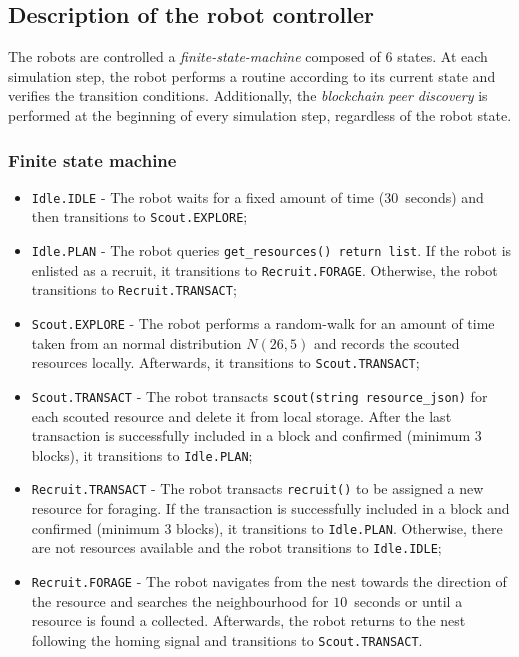 \documentclass[runningheads]{llncs}
\begin{document}
\subsection{Description of the robot controller}
The robots are controlled a \emph{finite-state-machine} composed of 6 states. At each simulation step, the robot performs a routine according to its current state and verifies the transition conditions. Additionally, the \emph{blockchain peer discovery } is performed at the beginning of every simulation step, regardless of the robot state.

\subsubsection{Finite state machine}
\label{sec:finite-state-machine}
\begin{itemize}
\item \texttt{Idle.IDLE} - The robot waits for a fixed amount of time ($30$~seconds) and then transitions to \texttt{Scout.EXPLORE};
\item \texttt{Idle.PLAN} - The robot queries \texttt{get\_resources() return list}. If the robot is enlisted as a recruit, it transitions to \texttt{Recruit.FORAGE}. Otherwise, the robot transitions to \texttt{Recruit.TRANSACT};
\item \texttt{Scout.EXPLORE} - The robot performs a random-walk for an amount of time taken from an normal distribution $N(26,5)$ and records the scouted resources locally. Afterwards, it transitions to \texttt{Scout.TRANSACT};
\item \texttt{Scout.TRANSACT} - The robot transacts \texttt{scout(string resource\_json)} for each scouted resource and delete it from local storage. After the last transaction is successfully included in a block and confirmed (minimum 3 blocks), it transitions to \texttt{Idle.PLAN};
\item \texttt{Recruit.TRANSACT} - The robot transacts \texttt{recruit()} to be assigned a new resource for foraging. If the transaction is successfully included in a block and confirmed (minimum 3 blocks), it transitions to \texttt{Idle.PLAN}. Otherwise, there are not resources available and the robot transitions to \texttt{Idle.IDLE};
\item \texttt{Recruit.FORAGE} - The robot navigates from the nest towards the direction of the resource and searches the neighbourhood for $10$~seconds or until a resource is found a collected. Afterwards, the robot returns to the nest following the homing signal and transitions to \texttt{Scout.TRANSACT}.
\end{itemize}
\end{document}

